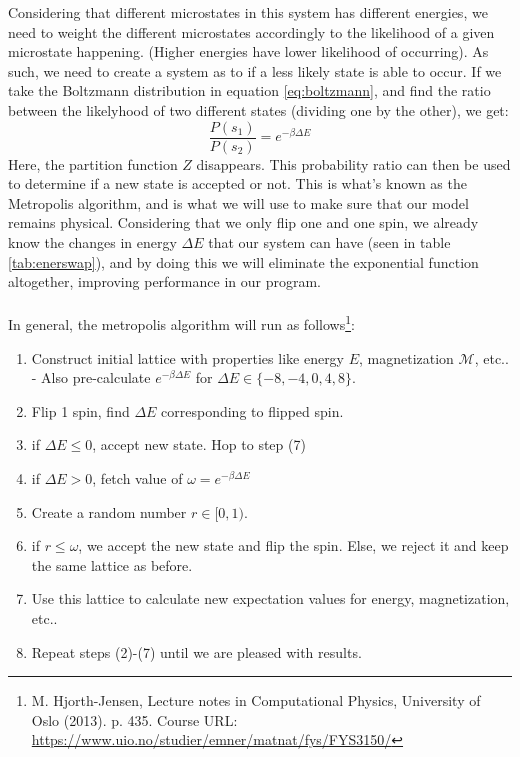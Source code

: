 \documentclass[reprint,english,notitlepage]{revtex4-1}  %
\begin{document}
Considering that different microstates in this system has different energies, we need to weight the different microstates accordingly to the likelihood of a given microstate happening. (Higher energies have lower likelihood of occurring). As such, we need to create a system as to if a less likely state is able to occur. If we take the Boltzmann distribution in equation \ref{eq:boltzmann}, and find the ratio between the likelyhood of two different states (dividing one by the other), we get:
\begin{equation}
    \frac{P(s_1)}{P(s_2)} = e^{-\beta\Delta E}
\end{equation}
Here, the partition function $Z$ disappears. This probability ratio can then be used to determine if a new state is accepted or not. This is what's known as the Metropolis algorithm, and is what we will use to make sure that our model remains physical. Considering that we only flip one and one spin, we already know the changes in energy $\Delta E$ that our system can have (seen in table \ref{tab:enerswap}), and by doing this we will eliminate the exponential function altogether, improving performance in our program.
\\
\\
In general, the metropolis algorithm will run as follows\footnote{M. Hjorth-Jensen, Lecture notes in Computational Physics, University of Oslo (2013). p. 435. Course URL: \url{https://www.uio.no/studier/emner/matnat/fys/FYS3150/}}:
\begin{enumerate}
    \item Construct initial lattice with properties like energy $E$, magnetization $\mathcal{M}$, etc.. - Also pre-calculate $e^{-\beta \Delta E}$ for $\Delta E \in \{-8,-4,0,4,8\}$.
    \item Flip 1 spin, find $\Delta E$ corresponding to flipped spin.
    \item if $\Delta E \leq 0$, accept new state. Hop to step (7)
    \item if $\Delta E > 0$, fetch value of $\omega = e^{-\beta \Delta E}$
    \item Create a random number $r \in [0,1)$.
    \item if $r \leq \omega$, we accept the new state and flip the spin. Else, we reject it and keep the same lattice as before.
    \item Use this lattice to calculate new expectation values for energy, magnetization, etc..
    \item Repeat steps (2)-(7) until we are pleased with results.
\end{enumerate}
\end{document}
